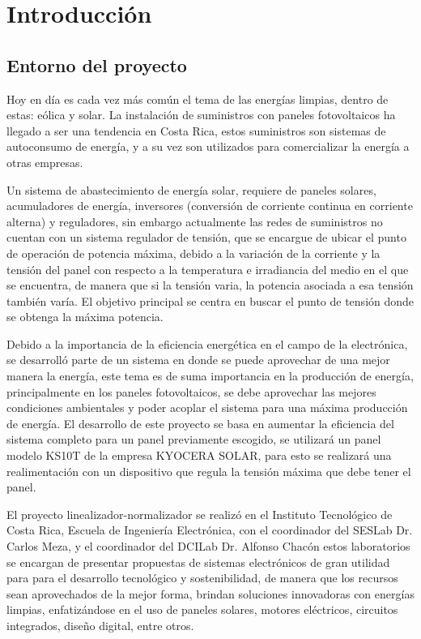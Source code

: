 
\chapter{Introducción}
\label{chp:intro}
\section{Entorno del proyecto}

Hoy en día es cada vez más común el tema de las energías limpias, dentro de estas: eólica y solar. La instalación de suministros con paneles fotovoltaicos ha llegado a ser una tendencia en Costa Rica, estos suministros son sistemas de autoconsumo de energía, y a su vez son utilizados para comercializar la energía a otras empresas. 

Un sistema de abastecimiento de energía solar, requiere de paneles solares, acumuladores de energía, inversores (conversión de corriente continua en corriente alterna) y reguladores, sin embargo actualmente las redes de suministros no cuentan con un sistema regulador de tensión, que se encargue de ubicar el punto de operación de potencia máxima, debido a la variación de la corriente y la tensión del panel con respecto a la temperatura e irradiancia del medio en el que se encuentra, de manera que si la tensión varia, la potencia asociada a esa tensión también varía. El objetivo principal se centra en buscar el punto de tensión donde se obtenga la máxima potencia.
 
Debido a la importancia de la eficiencia energética en el campo de la electrónica, se desarrolló parte de un sistema en donde se puede aprovechar de una mejor manera la energía, este tema es de suma importancia en la producción de energía, principalmente en los paneles fotovoltaicos, se debe aprovechar las mejores condiciones ambientales y poder acoplar el sistema para una máxima producción de energía. El desarrollo de este proyecto se basa en aumentar la eficiencia del sistema completo para un panel previamente escogido, se utilizará un panel modelo KS10T de la empresa KYOCERA SOLAR, para esto se realizará una realimentación con un dispositivo que regula la tensión máxima que debe tener el panel. 

El proyecto linealizador-normalizador se realizó en el Instituto Tecnológico de Costa Rica, Escuela de Ingeniería Electrónica, con el coordinador del SESLab Dr. Carlos Meza, y el coordinador del DCILab Dr. Alfonso Chacón estos laboratorios se encargan de presentar propuestas de sistemas electrónicos de gran utilidad para  para el desarrollo tecnológico y sostenibilidad, de manera que los recursos sean aprovechados de la mejor forma, brindan soluciones innovadoras con energías limpias, enfatizándose en el uso de paneles solares, motores eléctricos, circuitos integrados, diseño digital, entre otros. 

